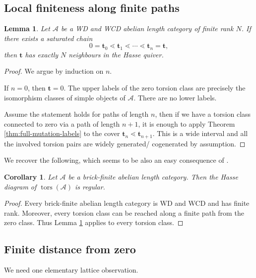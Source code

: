 \documentclass[11pt]{amsart}
\newtheorem{lemma}[theorem]{Lemma}
\newtheorem{corollary}[theorem]{Corollary}
\theoremstyle{definition}
\newcommand{\A}{\mathcal A}
\newcommand{\tors}{\operatorname{tors}}
\begin{document}
\subsection{Local finiteness along finite paths}

\begin{lemma}\label{lem:local-finiteness}
Let \(\A\) be a WD and WCD abelian length category of  finite rank \( N \). If there exists a saturated chain
\[
0=\mathbf t_0\lessdot\mathbf t_1\lessdot\cdots\lessdot\mathbf t_n=\mathbf t,
\]
then \( \mathbf{t} \) has exactly \( N \) neighbours in the Hasse quiver.
\end{lemma}

\begin{proof}
We argue by induction on \(n\).

If \(n=0\), then \(\mathbf t=0\). The upper labels of the zero torsion class are precisely the isomorphism classes of simple objects of \(\A\). There are no lower labels.

Assume the statement holds for paths of length \( n \), then if we have a torsion class connected to zero via a path of length \( n + 1 \), it is enough to apply Theorem \ref{thm:full-mutation-labels} to the cover \( \mathbf{t}_n \lessdot \mathbf{t}_{n + 1} \). This is a wide interval and all the involved torsion pairs are widely generated/ cogenerated by assumption.
\end{proof}

We recover the following, which seems to be also an easy consequence of \cite[Theorem 5.3]{BPPW}.

\begin{corollary}
Let $ \mathcal{A} $ be a brick-finite abelian length category.
Then the Hasse diagram of $ \tors(\A) $ is regular.
\end{corollary}

\begin{proof}
Every brick-finite abelian length category is WD and WCD and has finite rank. Moreover, every torsion class can be reached along a finite path from the zero class.
Thus Lemma \ref{lem:local-finiteness} applies to every torsion class.
\end{proof}

\subsection{Finite distance from zero}

We need one elementary lattice observation.
\end{document}
